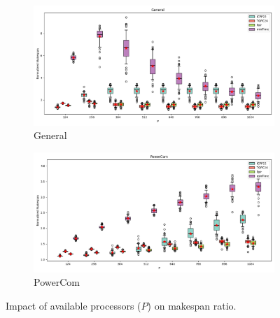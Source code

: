 \documentclass{article}
\begin{document}
\begin{figure}[htbp]
\\[2ex]
\begin{subfigure}[b]{0.32\textwidth}\includegraphics[width=\textwidth]{Results/P/P_General_boxplot}\caption{General}\label{fig:boxplot_figures_P_General}\end{subfigure}
\hfill
\begin{subfigure}[b]{0.32\textwidth}\includegraphics[width=\textwidth]{Results/P/P_PowerCom_boxplot}\caption{PowerCom}\label{fig:boxplot_figures_P_PowerCom}\end{subfigure}
\hfill
\caption{Impact of available processors ($P$) on makespan ratio.}
\label{fig:boxplot_figures_P}
\end{figure}
\end{document}
